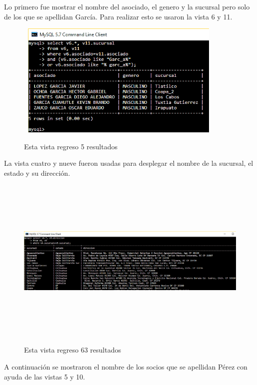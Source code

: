 \documentclass[12pt, titlepage]{article}
\begin{document}
	Lo primero fue mostrar el nombre del asociado, el genero y la sucursal pero solo de los que se apellidan García. Para realizar esto se usaron la vista 6  y 11.
	\begin{figure}[H]
		\begin{center}
			\includegraphics[width=10cm, height=5.5cm]{img/v13.png}
			\label{fig:13}
			\caption{Esta vista regreso 5 resultados}
		\end{center}
	\end{figure}
	La vista cuatro y nueve fueron usadas para desplegar el nombre de la sucursal, el estado y su dirección.
	\begin{figure}[H]
		\begin{center}
			\includegraphics[width=16cm, height=8cm]{img/v14.png}
			\label{fig:14}
			\caption{Esta vista regreso 63 resultados}
		\end{center}
	\end{figure}
	A continuación se mostraron el nombre de los socios que se apellidan Pérez con ayuda de las vistas 5 y 10.
\end{document}
